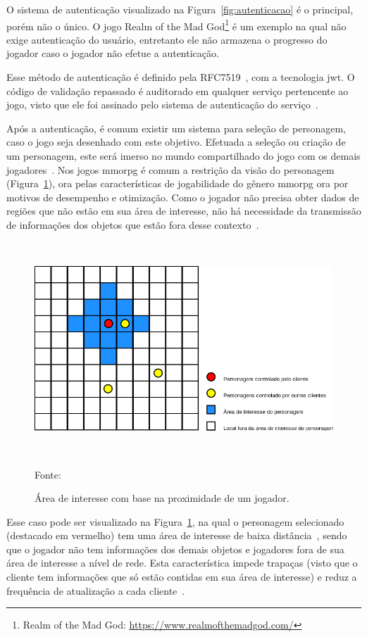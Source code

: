 O sistema de autenticação visualizado na Figura~\ref{fig:autenticacao} é o principal, porém não o único.
%
O jogo Realm of the Mad God\footnote{Realm of the Mad God: \url{https://www.realmofthemadgod.com/}} é um exemplo na qual não exige autenticação do usuário, entretanto ele não armazena o progresso do jogador caso o jogador não efetue a autenticação.


Esse método de autenticação é definido pela RFC7519~\cite{rfc7519}, com a tecnologia \ac{jwt}.
%
O código de validação repassado é auditorado em qualquer serviço pertencente ao jogo, visto que ele foi assinado pelo sistema de autenticação do serviço~\cite{Ikem2018May}.


Após a autenticação, é comum existir um sistema para seleção de personagem, caso o jogo seja desenhado com este objetivo.
%
Efetuada a seleção ou criação de um personagem, este será imerso no mundo compartilhado do jogo com os demais jogadores~\cite{matthiasrudy2011}.
%
Nos jogos \ac{mmorpg} é comum a restrição da visão do personagem (Figura~\ref{fig:proximidade}), ora pelas características de jogabilidade do gênero \ac{mmorpg} ora por motivos de desempenho e otimização.
%
Como o jogador não precisa obter dados de regiões que não estão em sua área de interesse, não há necessidade da transmissão de informações dos objetos que estão fora desse contexto~\cite{albion_online_unite}.

\begin{figure}[htb!]
\caption{Área de interesse com base na proximidade de um jogador.}
\label{fig:proximidade}
\includegraphics[height=8cm]{img/cap2/proximidade.png}
\centering

Fonte:~\cite{albion_online_unite}
\end{figure}


Esse caso pode ser visualizado na Figura~\ref{fig:proximidade}, na qual o personagem selecionado (destacado em vermelho) tem uma área de interesse de baixa distância~\cite{albion_online_unite}, sendo que o jogador não tem informações dos demais objetos e jogadores fora de sua área de interesse a nível de rede.
%
Esta característica impede trapaças (visto que o cliente tem informações que só estão contidas em sua área de interesse) e reduz a frequência de atualização a cada cliente~\cite{albion_online_unite}.


